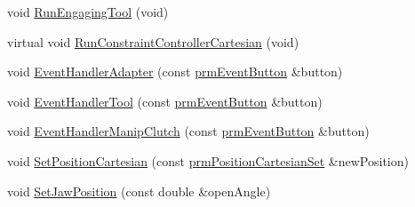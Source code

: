 \begin{DoxyCompactItemize}
\item 
void \hyperlink{classmts_intuitive_research_kit_p_s_m_a0c692ca79bf331140654b3f44d51abe3}{Run\-Engaging\-Tool} (void)
\item 
virtual void \hyperlink{classmts_intuitive_research_kit_p_s_m_a21dda0faab5c26d320e35a92e9c4bdae}{Run\-Constraint\-Controller\-Cartesian} (void)
\item 
void \hyperlink{classmts_intuitive_research_kit_p_s_m_a3416ba243d970650e66064bbef2ef8ac}{Event\-Handler\-Adapter} (const \hyperlink{classprm_event_button}{prm\-Event\-Button} \&button)
\item 
void \hyperlink{classmts_intuitive_research_kit_p_s_m_a7f74e9da087a2c7b138b04aa42783a49}{Event\-Handler\-Tool} (const \hyperlink{classprm_event_button}{prm\-Event\-Button} \&button)
\item 
void \hyperlink{classmts_intuitive_research_kit_p_s_m_ac4b7ad0ac81d86b6203da137033d6fef}{Event\-Handler\-Manip\-Clutch} (const \hyperlink{classprm_event_button}{prm\-Event\-Button} \&button)
\item 
void \hyperlink{classmts_intuitive_research_kit_p_s_m_abac993df2c49f0bfbd6fd25d357d5ba2}{Set\-Position\-Cartesian} (const \hyperlink{classprm_position_cartesian_set}{prm\-Position\-Cartesian\-Set} \&new\-Position)
\item 
void \hyperlink{classmts_intuitive_research_kit_p_s_m_a78302c549b180a354c8f70abe7a24c26}{Set\-Jaw\-Position} (const double \&open\-Angle)
\end{DoxyCompactItemize}
